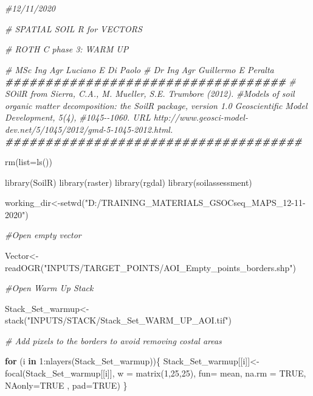 \documentclass[
  10pt,
  b5paper,
]{book}
\newenvironment{Shaded}{\begin{snugshade}}{\end{snugshade}}
\newcommand{\AttributeTok}[1]{\textcolor[rgb]{0.77,0.63,0.00}{#1}}
\newcommand{\CommentTok}[1]{\textcolor[rgb]{0.56,0.35,0.01}{\textit{#1}}}
\newcommand{\ConstantTok}[1]{\textcolor[rgb]{0.00,0.00,0.00}{#1}}
\newcommand{\ControlFlowTok}[1]{\textcolor[rgb]{0.13,0.29,0.53}{\textbf{#1}}}
\newcommand{\DecValTok}[1]{\textcolor[rgb]{0.00,0.00,0.81}{#1}}
\newcommand{\DocumentationTok}[1]{\textcolor[rgb]{0.56,0.35,0.01}{\textbf{\textit{#1}}}}
\newcommand{\FunctionTok}[1]{\textcolor[rgb]{0.00,0.00,0.00}{#1}}
\newcommand{\NormalTok}[1]{#1}
\newcommand{\OtherTok}[1]{\textcolor[rgb]{0.56,0.35,0.01}{#1}}
\newcommand{\SpecialCharTok}[1]{\textcolor[rgb]{0.00,0.00,0.00}{#1}}
\newcommand{\StringTok}[1]{\textcolor[rgb]{0.31,0.60,0.02}{#1}}
\begin{document}
\begin{Shaded}
\begin{Highlighting}[]
\CommentTok{\#12/11/2020}

\CommentTok{\# SPATIAL SOIL R  for VECTORS}

\CommentTok{\#   ROTH C phase 3: WARM UP}

\CommentTok{\# MSc Ing Agr Luciano E Di Paolo}
\CommentTok{\# Dr Ing Agr Guillermo E Peralta}
\DocumentationTok{\#\#\#\#\#\#\#\#\#\#\#\#\#\#\#\#\#\#\#\#\#\#\#\#\#\#\#\#\#\#\#\#\#\#\#}
\CommentTok{\# SOilR from Sierra, C.A., M. Mueller, S.E. Trumbore (2012). }
\CommentTok{\#Models of soil organic matter decomposition: the SoilR package, version 1.0 Geoscientific Model Development, 5(4), }
\CommentTok{\#1045{-}{-}1060. URL http://www.geosci{-}model{-}dev.net/5/1045/2012/gmd{-}5{-}1045{-}2012.html.}
\DocumentationTok{\#\#\#\#\#\#\#\#\#\#\#\#\#\#\#\#\#\#\#\#\#\#\#\#\#\#\#\#\#\#\#\#\#\#\#\#\#}

\FunctionTok{rm}\NormalTok{(}\AttributeTok{list=}\FunctionTok{ls}\NormalTok{()) }

\FunctionTok{library}\NormalTok{(SoilR)}
\FunctionTok{library}\NormalTok{(raster)}
\FunctionTok{library}\NormalTok{(rgdal)}
\FunctionTok{library}\NormalTok{(soilassessment)}

\NormalTok{working\_dir}\OtherTok{\textless{}{-}}\FunctionTok{setwd}\NormalTok{(}\StringTok{"D:/TRAINING\_MATERIALS\_GSOCseq\_MAPS\_12{-}11{-}2020"}\NormalTok{)}

\CommentTok{\#Open empty vector}

\NormalTok{Vector}\OtherTok{\textless{}{-}}\FunctionTok{readOGR}\NormalTok{(}\StringTok{"INPUTS/TARGET\_POINTS/AOI\_Empty\_points\_borders.shp"}\NormalTok{)}

\CommentTok{\#Open Warm Up Stack}

\NormalTok{Stack\_Set\_warmup}\OtherTok{\textless{}{-}} \FunctionTok{stack}\NormalTok{(}\StringTok{"INPUTS/STACK/Stack\_Set\_WARM\_UP\_AOI.tif"}\NormalTok{)}

\CommentTok{\# Add pixels to the borders to avoid removing costal areas}

\ControlFlowTok{for}\NormalTok{ (i }\ControlFlowTok{in} \DecValTok{1}\SpecialCharTok{:}\FunctionTok{nlayers}\NormalTok{(Stack\_Set\_warmup))\{}
\NormalTok{  Stack\_Set\_warmup[[i]]}\OtherTok{\textless{}{-}}\FunctionTok{focal}\NormalTok{(Stack\_Set\_warmup[[i]], }\AttributeTok{w =} \FunctionTok{matrix}\NormalTok{(}\DecValTok{1}\NormalTok{,}\DecValTok{25}\NormalTok{,}\DecValTok{25}\NormalTok{), }\AttributeTok{fun=}\NormalTok{ mean,  }\AttributeTok{na.rm =} \ConstantTok{TRUE}\NormalTok{, }\AttributeTok{NAonly=}\ConstantTok{TRUE}\NormalTok{ , }\AttributeTok{pad=}\ConstantTok{TRUE}\NormalTok{)}
\NormalTok{\}}


\end{Highlighting}
\end{Shaded}
\end{document}
